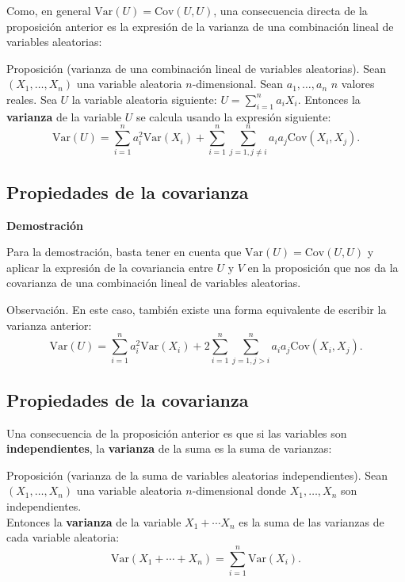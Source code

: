 \documentclass[]{book}
\begin{document}
Como, en general \(\mathrm{Var}(U)=\mathrm{Cov}(U,U)\), una consecuencia directa de la proposición anterior es la expresión de la varianza de una combinación lineal de variables aleatorias:

Proposición (varianza de una combinación lineal de variables aleatorias).
Sean \((X_1,\ldots,X_n)\) una variable aleatoria \(n\)-dimensional. Sean \(a_1, \ldots, a_n\) \(n\) valores reales. Sea \(U\) la variable aleatoria siguiente:
\(U=\sum\limits_{i=1}^n a_i X_i.\)
Entonces la \textbf{varianza} de la variable \(U\) se calcula usando la expresión siguiente:
\[
\mathrm{Var}(U)=\sum_{i=1}^n a_i^2 \mathrm{Var}(X_i)+\sum_{i=1}^n\sum_{j=1,j\neq i}^n a_i a_j \mathrm{Cov}(X_i,X_j).
\]

\hypertarget{propiedades-de-la-covarianza-8}{%
\subsection{Propiedades de la covarianza}\label{propiedades-de-la-covarianza-8}}

\textbf{Demostración}

Para la demostración, basta tener en cuenta que \(\mathrm{Var}(U)=\mathrm{Cov}(U,U)\) y aplicar la expresión de la covariancia entre \(U\) y \(V\) en la proposición que nos da la covarianza de una combinación lineal de variables aleatorias.

 Observación.
En este caso, también existe una forma equivalente de escribir la varianza anterior:
\[
\mathrm{Var}(U)=\sum_{i=1}^n a_i^2 \mathrm{Var}(X_i)+2\sum_{i=1}^n\sum_{j=1,j>i}^n a_i a_j \mathrm{Cov}(X_i,X_j).
\]

\hypertarget{propiedades-de-la-covarianza-9}{%
\subsection{Propiedades de la covarianza}\label{propiedades-de-la-covarianza-9}}

Una consecuencia de la proposición anterior es que si las variables son \textbf{independientes}, la \textbf{varianza} de la suma es la suma de varianzas:

Proposición (varianza de la suma de variables aleatorias independientes).
Sean \((X_1,\ldots,X_n)\) una variable aleatoria \(n\)-dimensional donde \(X_1,\ldots, X_n\) son independientes.\\
Entonces la \textbf{varianza} de la variable \(X_1+\cdots X_n\) es la suma de las varianzas de cada variable aleatoria:
\[
\mathrm{Var}(X_1+\cdots + X_n)=\sum_{i=1}^n \mathrm{Var}(X_i).
\]
\end{document}
